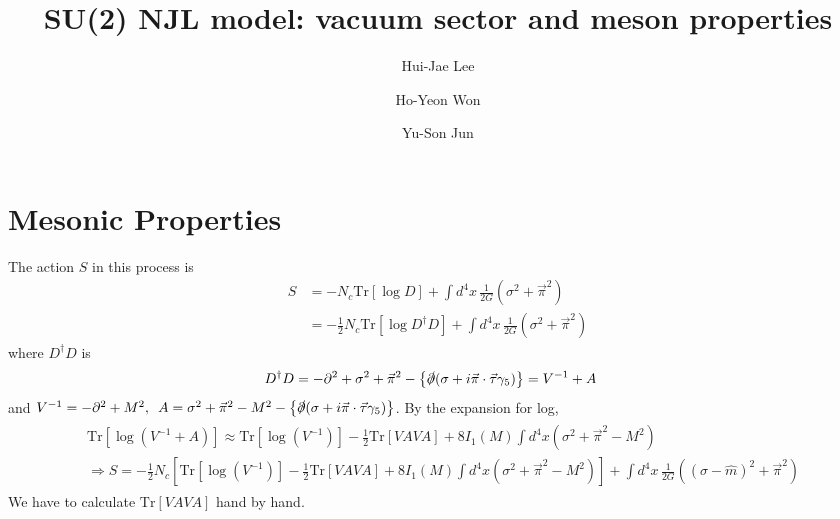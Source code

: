 \documentclass[tightenlines,floatfix,nofootinbib,superscriptaddress,fleqn]{revtex4-2}
\begin{document}
\title{\Large SU(2) NJL model: vacuum sector and meson properties}
\author{Hui-Jae Lee} 
  \author{Ho-Yeon Won}
  \author{Yu-Son Jun}
\maketitle

\section[2.4]{Mesonic Properties}
The action $S$ in this process is
\begin{align}\label{1-1}
  S &= -N_c\mathrm{Tr}\left[\log D\right]+\int d^4x\,\frac{1}{2G}\left(\sigma^2+\vec{\pi}^2\right)  \\
  &= -\frac{1}{2}N_c\mathrm{Tr}\left[\log D^\dagger D\right]
  +\int d^4x\,\frac{1}{2G}\left(\sigma^2+\vec{\pi}^2\right)
\end{align}
where $D^\dagger D$ is
\begin{align}\label{1-2}
  &D^\dagger D = -\partial^2+\sigma^2+\vec{\pi}^2
  -\left\{\slashed{\partial}(\sigma+i\vec{\pi}\cdot\vec{\tau}\gamma_5)\right\} 
  =V^{-1}+A
\end{align}
and $V^{-1}= -\partial^2+M^2,\,\,\, A=\sigma^2+\vec{\pi}^2-M^2
-\left\{\slashed{\partial}(\sigma+i\vec{\pi}\cdot\vec{\tau}\gamma_5)\right\}$.
By the expansion for log,
\begin{align}\label{1-3}
  \begin{split}
    &\mathrm{Tr}\left[\log\left(V^{-1}+A\right)\right] \approx 
    \mathrm{Tr}\left[\log\left(V^{-1}\right)\right]
    -\frac{1}{2}\mathrm{Tr}\left[VAVA\right]
    +8I_1(M)\int d^4x\left(\sigma^2+\vec{\pi}^2-M^2\right) \\
    &\Longrightarrow
    S=-\frac{1}{2}N_c\left[\mathrm{Tr}
    \left[\log\left(V^{-1}\right)\right]
    -\frac{1}{2}\mathrm{Tr}\left[VAVA\right]
    +8I_1(M)\int d^4x\left(\sigma^2+\vec{\pi}^2-M^2\right)\right]
    +\int d^4x\,\frac{1}{2G}\left(\left(\sigma-\hat{m}\right)^2+\vec{\pi}^2\right)
  \end{split}
\end{align}
We have to calculate $\mathrm{Tr}\left[VAVA\right]$ hand by hand.
\end{document}
